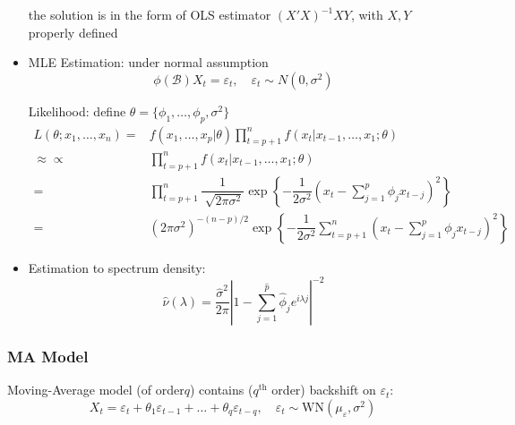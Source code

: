 \begin{itemize}[topsep=2pt,itemsep=0pt]
        the solution is in the form of OLS estimator $ (X'X)^{-1}XY $, with $ X,Y $ properly defined
        
        \item MLE Estimation: under normal assumption
        \begin{equation}
            \phi (\mathscr{B} )X_t=\varepsilon _t,\quad \varepsilon _t\sim N(0,\sigma ^2) 
        \end{equation}

        Likelihood: define $ \theta =\{\phi _1,\ldots,\phi _p,\sigma ^2\} $
        \begin{align}
            L(\theta ; x_1,\ldots ,x_n)=&f(x_1,\ldots,x_p|\theta )\prod_{t=p+1}^nf(x_t|x_{t-1},\ldots,x_{1};\theta )\\
            \approx \propto &\prod_{t=p+1}^nf(x_t|x_{t-1},\ldots,x_{1};\theta )\\
            =&\prod_{t=p+1}^n \dfrac{1}{\sqrt[]{2\pi \sigma ^2}}\exp\left\{ -\dfrac{1}{2\sigma ^2}(x_t-\sum_{j=1}^p \phi _jx_{t-j})^2 \right\}\\
            =&(2\pi\sigma ^2)^{-(n-p)/2}\exp\left\{ -\dfrac{1}{2\sigma ^2}\sum_{t=p+1}^n (x_t-\sum_{j=1}^p \phi _jx_{t-j})^2\right\}
        \end{align}
        
        \item Estimation to spectrum density:
        \begin{equation}
            \hat{\nu }(\lambda )=\dfrac{\hat{\sigma }^2}{2\pi}\left\vert 1-\sum_{j=1}^{\hat{p}}\hat{\phi }_je^{i\lambda j} \right\vert^{-2} 
        \end{equation}
        
    \end{itemize}
    
        


\subsubsection{MA Model}

    Moving-Average model (of order$ q $) contains ($ q^\mathrm{th}  $ order) backshift on $ \varepsilon _t $:
    \begin{equation}
        X_t=\varepsilon _t+\theta _1\varepsilon _{t-1}+\ldots +\theta _q\varepsilon _{t-q},\quad \varepsilon _t\sim \mathrm{WN}(\mu_\varepsilon  ,\sigma ^2) 
    \end{equation}

